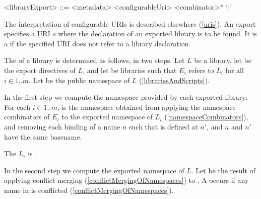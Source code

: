 \documentclass[makeidx]{article}
\begin{document}
\begin{grammar}
<libraryExport> ::= <metadata> \EXPORT{} <configurableUri> <combinator>* `;'
\end{grammar}

\LMHash{}%
The interpretation of configurable URIs is described elsewhere
(\ref{uris}).
An export specifies a URI $s$
where the declaration of an exported library is to be found.
It is a  if the specified URI
does not refer to a library declaration.

\LMHash{}%
The
of a library is determined as follows, in two steps.
Let $L$ be a library,
let  be the export directives of $L$,
and let  be libraries
such that $E_i$ refers to $L_i$ for all $i \in 1 .. m$.
Let  be the public namespace of $L$
(\ref{librariesAndScripts}).


\LMHash{}%
In the first step we compute the namespace provided by each exported library:
For each $i \in 1 .. m$,
 is
the namespace obtained from applying
the namespace combinators of $E_i$ to
the exported namespace of $L_i$
(\ref{namespaceCombinators}),
and removing each binding of a name $n$ such that
 is defined at $n'$,
and $n$ and $n'$ have the same basename.

\LMHash{}%
The
$L_i$ is .

\LMHash{}%
In the second step we compute the exported namespace of $L$.
Let  be the result of applying
conflict merging
(\ref{conflictMergingOfNamespaces})
to .
A  occurs if any name in
is conflicted
(\ref{conflictMergingOfNamespaces}).

\end{document}
